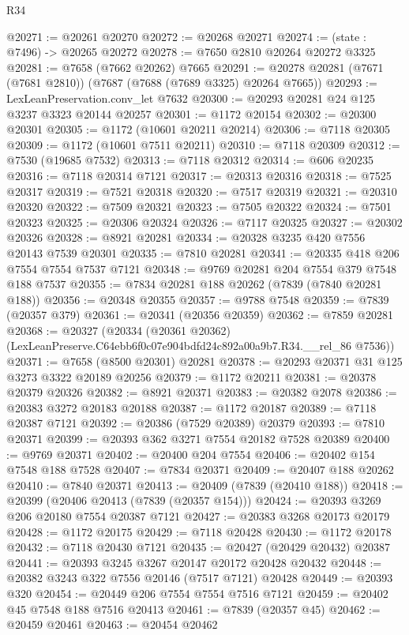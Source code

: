 \begin{lexlean}{R34}
\begin{coremodule}
@20271 := @20261 @20270
@20272 := @20268 @20271
@20274 := (state : @7496) -> @20265 @20272
@20278 := @7650 @2810 @20264 @20272 @3325
@20281 := @7658 (@7662 @20262) @7665
@20291 := @20278 @20281 (@7671 (@7681 @2810)) (@7687 (@7688 (@7689 @3325) @20264 @7665))
@20293 := LexLeanPreservation.conv_let @7632
@20300 := @20293 @20281 @24 @125 @3237 @3323 @20144 @20257
@20301 := @1172 @20154
@20302 := @20300 @20301
@20305 := @1172 (@10601 @20211 @20214)
@20306 := @7118 @20305
@20309 := @1172 (@10601 @7511 @20211)
@20310 := @7118 @20309
@20312 := @7530 (@19685 @7532)
@20313 := @7118 @20312
@20314 := @606 @20235
@20316 := @7118 @20314 @7121
@20317 := @20313 @20316
@20318 := @7525 @20317
@20319 := @7521 @20318
@20320 := @7517 @20319
@20321 := @20310 @20320
@20322 := @7509 @20321
@20323 := @7505 @20322
@20324 := @7501 @20323
@20325 := @20306 @20324
@20326 := @7117 @20325
@20327 := @20302 @20326
@20328 := @8921 @20281
@20334 := @20328 @3235 @420 @7556 @20143 @7539 @20301
@20335 := @7810 @20281
@20341 := @20335 @418 @206 @7554 @7554 @7537 @7121
@20348 := @9769 @20281 @204 @7554 @379 @7548 @188 @7537
@20355 := @7834 @20281 @188 @20262 (@7839 (@7840 @20281 @188))
@20356 := @20348 @20355
@20357 := @9788 @7548
@20359 := @7839 (@20357 @379)
@20361 := @20341 (@20356 @20359)
@20362 := @7859 @20281
@20368 := @20327
    (@20334 (@20361 @20362) (LexLeanPreserve.C64ebb6f0c07e904bdfd24c892a00a9b7.R34.__rel_86 @7536))
@20371 := @7658 (@8500 @20301) @20281
@20378 := @20293 @20371 @31 @125 @3273 @3322 @20189 @20256
@20379 := @1172 @20211
@20381 := @20378 @20379 @20326
@20382 := @8921 @20371
@20383 := @20382 @2078
@20386 := @20383 @3272 @20183 @20188
@20387 := @1172 @20187
@20389 := @7118 @20387 @7121
@20392 := @20386 (@7529 @20389) @20379
@20393 := @7810 @20371
@20399 := @20393 @362 @3271 @7554 @20182 @7528 @20389
@20400 := @9769 @20371
@20402 := @20400 @204 @7554
@20406 := @20402 @154 @7548 @188 @7528
@20407 := @7834 @20371
@20409 := @20407 @188 @20262
@20410 := @7840 @20371
@20413 := @20409 (@7839 (@20410 @188))
@20418 := @20399 (@20406 @20413 (@7839 (@20357 @154)))
@20424 := @20393 @3269 @206 @20180 @7554 @20387 @7121
@20427 := @20383 @3268 @20173 @20179
@20428 := @1172 @20175
@20429 := @7118 @20428
@20430 := @1172 @20178
@20432 := @7118 @20430 @7121
@20435 := @20427 (@20429 @20432) @20387
@20441 := @20393 @3245 @3267 @20147 @20172 @20428 @20432
@20448 := @20382 @3243 @322 @7556 @20146 (@7517 @7121) @20428
@20449 := @20393 @320
@20454 := @20449 @206 @7554 @7554 @7516 @7121
@20459 := @20402 @45 @7548 @188 @7516 @20413
@20461 := @7839 (@20357 @45)
@20462 := @20459 @20461
@20463 := @20454 @20462

\end{coremodule}
\end{lexlean}
